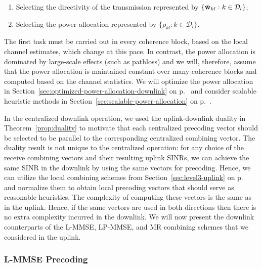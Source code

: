 \begin{enumerate}

\item Selecting the directivity of the transmission represented by $\{ \bar{\mathbf{w}}_{kl} : k \in \mathcal{D}_l \} $; 

\item Selecting the power allocation represented by $\{ \rho_{kl} : k \in \mathcal{D}_l \}$. 

\end{enumerate}

The first task must be carried out in every coherence block, based on the local channel estimates, which change at this pace. In contrast, the power allocation is dominated by large-scale effects (such as pathloss) and we will, therefore, assume that the power allocation is maintained constant over many coherence blocks and computed based on the channel statistics. We will optimize the power allocation in Section~\ref{sec:optimized-power-allocation-downlink} on p.~\pageref{sec:optimized-power-allocation-downlink} and consider scalable heuristic methods in Section~\ref{sec:scalable-power-allocation} on p.~\pageref{sec:scalable-power-allocation}.

In the centralized downlink operation, we used the uplink-downlink duality in Theorem~\ref{prop:duality} to motivate that each centralized precoding vector should be selected to be parallel to the corresponding centralized combining vector. The duality result is not unique to the centralized operation: for any choice of the receive combining vectors and their resulting uplink SINRs, we can achieve the same SINR in the downlink by using the same vectors for precoding. Hence, we can utilize the local combining schemes from Section~\ref{sec:level3-uplink} on p.~\pageref{sec:level3-uplink} and normalize them to obtain local precoding vectors that should serve as reasonable heuristics. 
The  complexity of computing these vectors is the same as in the uplink. Hence, if the same vectors are used in both directions then there is no extra complexity incurred in the downlink. We will now present the downlink counterparts of the L-MMSE, LP-MMSE, and MR combining schemes that we considered in the uplink.

\subsubsection{L-MMSE Precoding}

